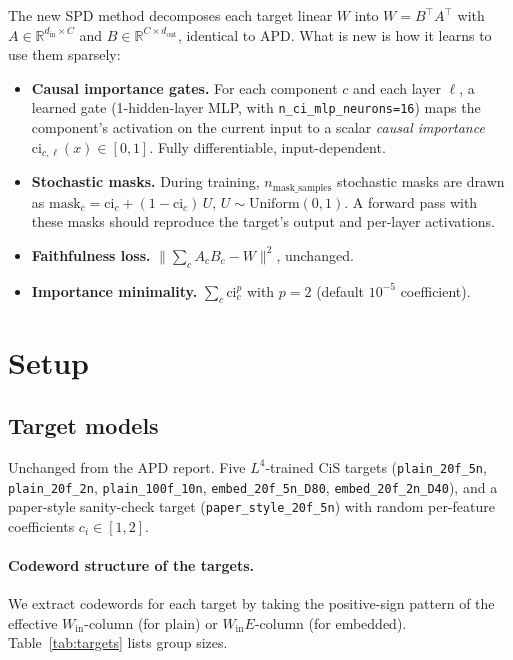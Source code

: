 \documentclass[11pt]{article}
\newcommand{\Wein}{W_{\mathrm{in}}}
\begin{document}
The new SPD method decomposes each target linear $W$ into $W = B^\top A^\top$
with $A \in \mathbb{R}^{d_\mathrm{in}\times C}$ and
$B \in \mathbb{R}^{C\times d_\mathrm{out}}$, identical to APD. What is new
is how it learns to use them sparsely:

\begin{itemize}
\item \textbf{Causal importance gates.} For each component $c$ and each
  layer $\ell$, a learned gate (1-hidden-layer MLP, with
  \texttt{n\_ci\_mlp\_neurons=16}) maps the component's activation on the
  current input to a scalar \emph{causal importance}
  $\mathrm{ci}_{c,\ell}(x) \in [0, 1]$. Fully differentiable, input-dependent.
\item \textbf{Stochastic masks.} During training, $n_\mathrm{mask\_samples}$
  stochastic masks are drawn as $\mathrm{mask}_c = \mathrm{ci}_c + (1 -
  \mathrm{ci}_c)\,U$, $U \sim \mathrm{Uniform}(0, 1)$. A forward pass
  with these masks should reproduce the target's output and per-layer
  activations.
\item \textbf{Faithfulness loss.} $\|\sum_c A_cB_c - W\|^2$, unchanged.
\item \textbf{Importance minimality.} $\sum_c \mathrm{ci}_c^p$ with
  $p = 2$ (default $10^{-5}$ coefficient).
\end{itemize}

\section{Setup}

\subsection{Target models}

Unchanged from the APD report. Five $L^4$-trained CiS targets
(\texttt{plain\_20f\_5n}, \texttt{plain\_20f\_2n},
\texttt{plain\_100f\_10n}, \texttt{embed\_20f\_5n\_D80},
\texttt{embed\_20f\_2n\_D40}), and a paper-style sanity-check target
(\texttt{paper\_style\_20f\_5n}) with random per-feature coefficients
$c_i \in [1, 2]$.

\paragraph{Codeword structure of the targets.} We extract codewords for
each target by taking the positive-sign pattern of the effective
$\Wein$-column (for plain) or $\Wein E$-column (for embedded).
Table~\ref{tab:targets} lists group sizes.
\end{document}

